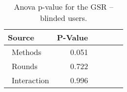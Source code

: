 
\begin{table}[!htb]
\centering
\caption{Anova p-value for the GSR -- blinded users.}
\label{tab:blocanova_gsr_two_way_blind}
\begin{tabular}{lrrrrl}
\toprule
          Source & P-Value \\
\midrule
    \    Methods &   0.051 \\
     \    Rounds &   0.722 \\
\    Interaction &   0.996 \\
\bottomrule
\end{tabular}
\end{table}


